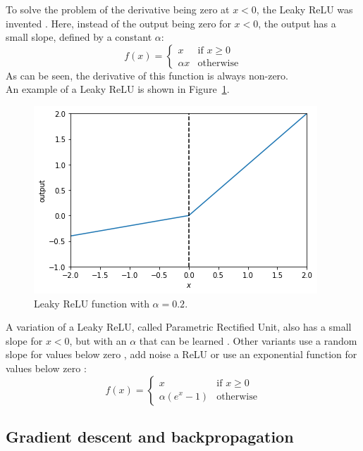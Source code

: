 To solve the problem of the derivative being zero at $x<0$, the Leaky ReLU was invented \citep{maas2013rectifier}. Here, instead of the output being zero for $x<0$, the output has a small slope, defined by a constant $\alpha$:
\begin{equation}
    f(x) = \begin{cases}
        x & \text{if $x \ge 0$}\\
        \alpha x & \text{otherwise}
        \end{cases}
\end{equation}
As can be seen, the derivative of this function is always non-zero.\\
An example of a Leaky ReLU is shown in Figure~\ref{fig:lrelu}.\\
\begin{figure}[htb]
    \centering
    \includegraphics[width=.8\linewidth]{images/activation_functions/lrelu.png}
    \caption[Leaky ReLU function]{Leaky ReLU function with $\alpha = 0.2$.}
    \label{fig:lrelu}
\end{figure}

A variation of a Leaky ReLU, called Parametric Rectified Unit, also has a small slope for $x<0$, but with an $\alpha$ that can be learned \citep{journals/corr/HeZR015}. Other variants use a random slope for values below zero \citep{journals/corr/XuWCL15}, add noise a ReLU \citep{conf/icml/NairH10} or use an exponential function for values below zero \citep{journals/corr/ClevertUH15}:
\begin{equation}
    f(x) = \begin{cases}
        x & \text{if $x \ge 0$}\\
        \alpha (e^x-1) & \text{otherwise}
        \end{cases}
\end{equation}

\subsection{Gradient descent and backpropagation} %
\label{sub:gradient_descent_and_backpropagation}

